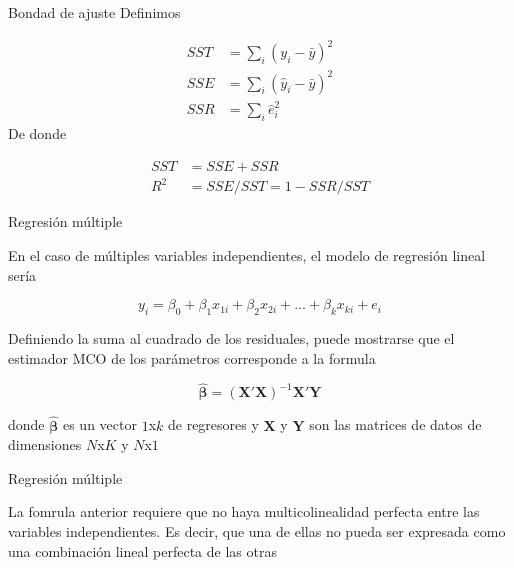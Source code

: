 \documentclass{beamer}
\begin{document}
\begin{frame}{Bondad de ajuste}
    Definimos

    \begin{align*}
        SST&=\sum_i(y_i-\bar{y})^2\\
        SSE&=\sum_i(\hat{y}_i-\bar{y})^2\\
        SSR&=\sum_i\hat{e}_i^2
    \end{align*}
De donde

\begin{align*}
    SST&=SSE+SSR\\
    R^2&=SSE/SST=1-SSR/SST
\end{align*}

\end{frame}

\begin{frame}{Regresión múltiple}

En el caso de  múltiples variables independientes, el modelo de regresión lineal sería

\begin{equation*}
    y_i=\beta_0+\beta_1x_{1i}+\beta_2x_{2i}+...+\beta_kx_{ki}+e_i
\end{equation*}

Definiendo la suma al cuadrado de los residuales, puede mostrarse que el estimador MCO de los parámetros corresponde a la formula

\begin{equation*}
    \boldsymbol{\hat{\beta}}=(\mathbf{X'X})^{-1}\mathbf{X'Y}
\end{equation*}

donde $\boldsymbol{\hat{\beta}}$ es un vector $1$x$k$ de regresores y $\mathbf{X}$ y $\mathbf{Y}$ son las matrices de datos de dimensiones $N$x$K$ y $N$x$1$
   
\end{frame}

\begin{frame}{Regresión múltiple}

La fomrula anterior requiere que no haya multicolinealidad perfecta entre las variables independientes. Es decir, que una de ellas no pueda ser expresada como una combinación lineal perfecta de las otras
    
\end{frame}
\end{document}
